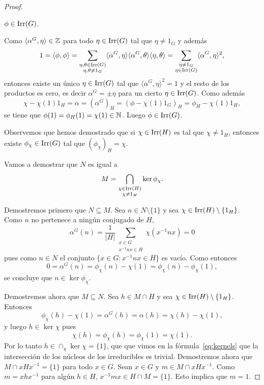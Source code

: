 \begin{proof}
  \begin{claim}
  $\phi\in\operatorname{Irr}(G)$.
  \end{claim}
  
  Como $\langle\alpha^G,\eta\rangle\in\mathbb{Z}$ para todo $\eta\in\operatorname{Irr}(G)$ tal que $\eta\ne 1_G$ y además 
  \[
  1=\langle\phi,\phi\rangle
  =\sum_{\substack{\eta,\theta\in\operatorname{Irr}(G)\\\eta,\theta\ne1_G}}\langle\alpha^G,\eta\rangle\langle\alpha^G,\theta\rangle\langle\eta,\theta\rangle
  =\sum_{\substack{\eta\ne 1_G\\\eta\in\operatorname{Irr}(G)}}\langle\alpha^G,\eta\rangle^2,
  \]
  entonces existe un único $\eta\in\operatorname{Irr}(G)$ tal que 
  $\langle\alpha^G,\eta\rangle^2=1$ y el resto de los productos es cero, es decir 
  $\alpha^G=\pm\eta$ para un cierto $\eta\in\operatorname{Irr}(G)$. Como además 
  \[
  \chi-\chi(1)1_H=\alpha=(\alpha^G)_H=(\phi-\chi(1)1_G)_H=\phi_H-\chi(1)1_H,
  \]
  se tiene que $\phi(1)=\phi_H(1)=\chi(1)\in\mathbb{N}$. Luego $\phi\in\operatorname{Irr}(G)$. 

  \medskip
  Observemos que hemos demostrado que si $\chi\in\operatorname{Irr}(H)$ es tal que $\chi\ne 1_H$, entonces
  existe $\phi_\chi\in\operatorname{Irr}(G)$ tal que $(\phi_\chi)_H=\chi$. 
  
  \medskip
  Vamos a demostrar que $N$ es igual a
  \[
	M=\bigcap_{\substack{\chi\in\operatorname{Irr}(H)\\\chi\ne1_H}}\ker\phi_{\chi}.
  \]

  Demostremos primero que $N\subseteq M$. 
  Sea $n\in N\setminus\{1\}$ y sea $\chi\in\operatorname{Irr}(H)\setminus\{1_H\}$. Como $n$ no pertenece
  a ningún conjugado de $H$, 
  \[
	\alpha^G(n)=\frac{1}{|H|}\sum_{\substack{x\in G\\x^{-1}nx\in H}}\chi(x^{-1}nx)=0
  \]
  pues como $n\in N$ el conjunto $\{x\in G:x^{-1}nx\in H\}$ es vacío. Como entonces 
  \[
  0=\alpha^G(n)
  =\phi_{\chi}(n)-\chi(1)=\phi_{\chi}(n)-\phi_{\chi}(1),
  \]
  se concluye que $n\in\ker\phi_{\chi}$. 
  
  Demostremos ahora que $M\subseteq N$. 
  Sea $h\in M\cap H$ y sea $\chi\in\operatorname{Irr}(H)\setminus\{1_H\}$. Entonces
  \[
    \phi_{\chi}(h)-\chi(1)=\alpha^G(h)=\alpha(h)=\chi(h)-\chi(1),
  \]
  y luego $h\in\ker\chi$ pues 
  \[
    \chi(h)=\phi_{\chi}(h)=\phi_{\chi}(1)=\chi(1).
  \]
  Por lo tanto $h\in\cap_{\chi}\ker\chi=\{1\}$, que que vimos en la fórmula~\eqref{eq:kernels} que
  la intersección de los núcleos de los irreducibles es trivial. Demostremos ahora que $M\cap
  xHx^{-1}=\{1\}$ para todo $x\in G$. Sean $x\in G$ y $m\in M\cap xHx^{-1}$. Como
  $m=xhx^{-1}$ para algún $h\in H$, $x^{-1}mx\in H\cap M=\{1\}$.  Esto implica que
  $m=1$.
\end{proof}


